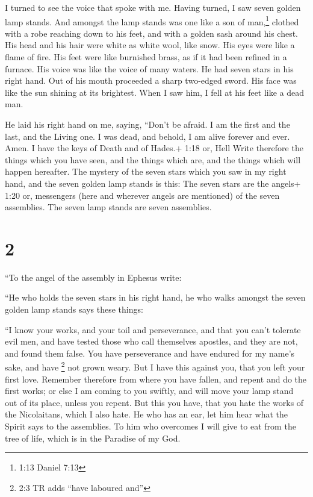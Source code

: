  I turned to see the voice that spoke with me. Having
turned, I saw seven golden lamp stands.  And amongst the
lamp stands was one like a son of man,\footnote{1:13 Daniel 7:13}
clothed with a robe reaching down to his feet, and with a golden sash
around his chest.  His head and his hair were white as
white wool, like snow. His eyes were like a flame of fire. 
His feet were like burnished brass, as if it had been refined in a
furnace. His voice was like the voice of many waters.  He
had seven stars in his right hand. Out of his mouth proceeded a sharp
two-edged sword. His face was like the sun shining at its brightest.
 When I saw him, I fell at his feet like a dead man.

He laid his right hand on me, saying, ``Don't be afraid. I am the first
and the last,  and the Living one. I was dead, and behold,
I am alive forever and ever. Amen. I have the keys of Death and of
Hades.+ 1:18 or, Hell  Write therefore the things which you
have seen, and the things which are, and the things which will happen
hereafter.  The mystery of the seven stars which you saw in
my right hand, and the seven golden lamp stands is this: The seven stars
are the angels+ 1:20 or, messengers (here and wherever angels are
mentioned) of the seven assemblies. The seven lamp stands are seven
assemblies.

\hypertarget{section-1}{%
\section{2}\label{section-1}}

 ``To the angel of the assembly in Ephesus write:

``He who holds the seven stars in his right hand, he who walks amongst
the seven golden lamp stands says these things:

 ``I know your works, and your toil and perseverance, and
that you can't tolerate evil men, and have tested those who call
themselves apostles, and they are not, and found them false.
 You have perseverance and have endured for my name's sake,
and have \footnote{2:3 TR adds ``have laboured and''} not grown weary.
 But I have this against you, that you left your first love.
 Remember therefore from where you have fallen, and repent
and do the first works; or else I am coming to you swiftly, and will
move your lamp stand out of its place, unless you repent. 
But this you have, that you hate the works of the Nicolaitans, which I
also hate.  He who has an ear, let him hear what the Spirit
says to the assemblies. To him who overcomes I will give to eat from the
tree of life, which is in the Paradise of my God.

